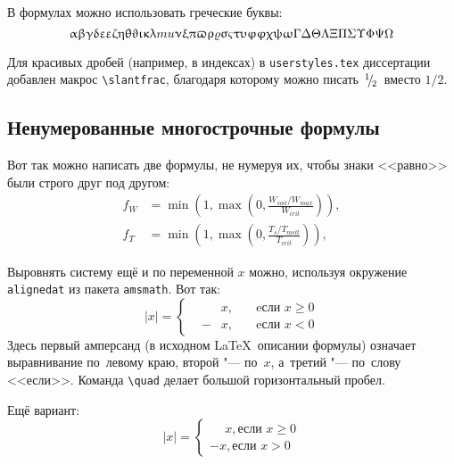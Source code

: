 В формулах можно использовать греческие буквы:
\[
\alpha\beta\gamma\delta\epsilon\varepsilon\zeta\eta\theta\vartheta\iota\kappa%
\lambda\\mu\nu\xi\pi\varpi\rho\varrho\sigma\varsigma\tau\upsilon\phi\varphi%
\chi\psi\omega\Gamma\Delta\Theta\Lambda\Xi\Pi\Sigma\Upsilon\Phi\Psi\Omega
\]

Для красивых дробей (например, в индексах) в
\verb+userstyles.tex+ диссертации добавлен макрос
\verb+\slantfrac+, благодаря которому можно
писать $\hspace{3pt}\!^{1}\!\!\hspace{1pt}/ \hspace{2pt}\!\!_{2}\!\hspace{3pt}$ вместо $1/2$.

\subsection{Ненумерованные многострочные формулы} \label{subsec:ch1/sec3/sub2}

Вот так можно написать две формулы, не нумеруя их, чтобы знаки <<равно>> были
строго друг под другом:
\begin{align}
  f_W & =  \min \left( 1, \max \left( 0, \frac{W_{soil} / W_{max}}{W_{crit}} \right)  \right), \nonumber \\
  f_T & =  \min \left( 1, \max \left( 0, \frac{T_s / T_{melt}}{T_{crit}} \right)  \right), \nonumber
\end{align}

Выровнять систему ещё и по переменной $ x $ можно, используя окружение
\verb|alignedat| из пакета \verb|amsmath|. Вот так:
\[
    |x| = \left\{
    \begin{alignedat}{2}
        &&x, \quad &\text{eсли } x\geqslant 0 \\
        &-&x, \quad & \text{eсли } x<0
    \end{alignedat}
    \right.
\]
Здесь первый амперсанд (в исходном \LaTeX\ описании формулы) означает
выравнивание по~левому краю, второй "--- по~$ x $, а~третий "--- по~слову
<<если>>. Команда \verb|\quad| делает большой горизонтальный пробел.

Ещё вариант:
\[
    |x|=
    \begin{cases}
    \phantom{-}x, \text{если } x \geqslant 0 \\
    -x, \text{если } x>0
    \end{cases}
\]

